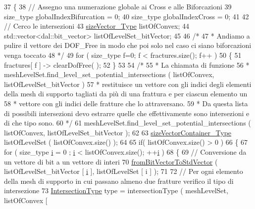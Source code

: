 \begin{DoxyCode}
37 \{
38     \textcolor{comment}{// Assegno una numerazione globale ai Cross e alle Biforcazioni}
39     size\_type globalIndexBifurcation = 0;
40     size\_type globalIndexCross = 0;
41 
42     \textcolor{comment}{// Cerco le intersezioni}
43     \hyperlink{Core_8h_a83c51913d041a5001e8683434c09857f}{sizeVector\_Type} listOfConvex;
44     std::vector<dal::bit\_vector> listOfLevelSet\_bitVector;
45 
46     \textcolor{comment}{/*}
47 \textcolor{comment}{     * Andiamo a pulire il vettore dei DOF\_Free in modo che poi solo nel caso ci siano biforcazioni venga
       toccato}
48 \textcolor{comment}{     */} 
49     \textcolor{keywordflow}{for} ( size\_type f=0; f < fractures.size(); f++ )
50     \{
51         fractures[ f ] -> clearDofFree( );
52     \}
53     
54     \textcolor{comment}{/*}
55 \textcolor{comment}{     * La chiamata di funzione }
56 \textcolor{comment}{     *              meshLevelSet.find\_level\_set\_potential\_intersections ( listOfConvex,
       listOfLevelSet\_bitVector )}
57 \textcolor{comment}{     * restituisce un vettore con gli indici degli elementi della mesh di supporto tagliati da più di una
       frattura e per ciascun elemento un}
58 \textcolor{comment}{     * vettore con gli indici delle fratture che lo attraversano. }
59 \textcolor{comment}{     * Da questa lista di possibili intersezioni devo estrarre quelle che effettivamente sono intersezioni
       e di che tipo sono.}
60 \textcolor{comment}{     */}
61     meshLevelSet.find\_level\_set\_potential\_intersections ( listOfConvex, listOfLevelSet\_bitVector );
62 
63     \hyperlink{Core_8h_a80e8381d86ecb0a7f4f87ff84d1a0be5}{sizeVectorContainer\_Type} listOfLevelSet ( listOfConvex.size() );
64 
65     \textcolor{keywordflow}{if}( listOfConvex.size() > 0 )
66     \{
67         \textcolor{keywordflow}{for} ( size\_type \hyperlink{matrici_8m_a6f6ccfcf58b31cb6412107d9d5281426}{i} = 0 ; \hyperlink{matrici_8m_a6f6ccfcf58b31cb6412107d9d5281426}{i} < listOfConvex.size(); ++\hyperlink{matrici_8m_a6f6ccfcf58b31cb6412107d9d5281426}{i} )
68         \{
69             \textcolor{comment}{// Conversione da un vettore di bit a un vettore di interi}
70             \hyperlink{UsefulFunctions_8h_a0ea0b08a12a1e6a94718cf3bcd60edeb}{fromBitVectorToStdVector} ( listOfLevelSet\_bitVector [ 
      \hyperlink{matrici_8m_a6f6ccfcf58b31cb6412107d9d5281426}{i} ], listOfLevelSet [ i ] );
71 
72             \textcolor{comment}{// Per ogni elemento della mesh di supporto in cui passano almeno due fratture verifico il tipo
       di intersezione}
73             \hyperlink{classFractureIntersect_a9a4e4a784fa4c8e359767ed543f89dc5}{IntersectionType} type = intersectionType ( meshLevelSet, listOfConvex [ 

\end{DoxyCode}
